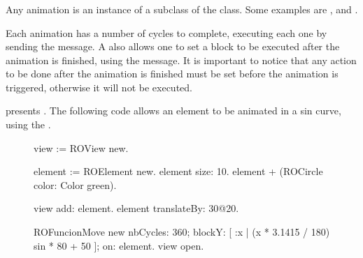 \documentclass[a4paper,10pt,twoside]{book}
\begin{document}
%
%

\subsubsection*{}
Any animation is an instance of a subclass of the  class. Some examples are ,  and .

Each animation has a number of cycles to complete, executing each one by sending the  message.
A  also allows one to set a block to be executed after the animation is finished, using the  message. It is important to notice that any action to be done after the animation is finished must be set before the animation is triggered, otherwise it will not be executed. 

 presents . The following code allows an element to be animated in a sin curve, using the .

\begin{figure}[H]
\begin{code}{}
view := ROView new.

element := ROElement new.
element size: 10.
element + (ROCircle color: Color green).

view add: element.
element translateBy: 30@20.

ROFuncionMove new
	nbCycles: 360;
	blockY: [ :x | (x * 3.1415 / 180) sin * 80 + 50 ];
	on: element.
view open.
\end{code}
\end{figure}
\end{document}

